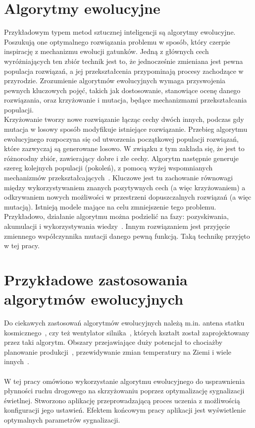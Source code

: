 \section*{Algorytmy ewolucyjne} Przykładowym typem metod sztucznej inteligencji są algorytmy ewolucyjne. Poszukują one optymalnego rozwiązania problemu w sposób, który czerpie inspirację z mechanizmu ewolucji gatunków. Jedną z głównych cech wyróżniających ten zbiór technik jest to, że jednocześnie zmieniana jest pewna populacja rozwiązań, a jej przekształcenia przypominają procesy zachodzące w przyrodzie. Zrozumienie algorytmów ewolucyjnych wymaga przyswojenia pewnych kluczowych pojęć, takich jak dostosowanie, stanowiące ocenę danego rozwiązania, oraz krzyżowanie i mutacja, będące mechanizmami przekształcania populacji. \\Krzyżowanie tworzy nowe rozwiązanie łącząc cechy dwóch innych, podczas gdy mutacja w losowy sposób modyfikuje istniejące rozwiązanie. 
Przebieg algorytmu ewolucyjnego rozpoczyna się od utworzenia początkowej populacji rozwiązań, które zazwyczaj są generowane losowo. W związku z tym zakłada się, że jest to różnorodny zbiór, zawierający dobre i złe cechy.
Algorytm następnie generuje szereg kolejnych populacji (pokoleń), z pomocą wyżej wspomnianych mechanizmów przekształcających~\cite{Cohoon:2003:EAP:903758.903786}. Kluczowe jest tu zachowanie równowagi między wykorzystywaniem znanych pozytywnych cech (a więc krzyżowaniem) a odkrywaniem nowych możliwości w przestrzeni dopuszczalnych rozwiązań (a więc mutacją). Istnieją modele mające na celu zmniejszenie tego problemu. Przykładowo, działanie algorytmu można podzielić na fazy: pozyskiwania, akumulacji i wykorzystywania wiedzy~\cite{10.1371/journal.pone.0095693}. Innym rozwiązaniem jest przyjęcie zmiennego współczynnika mutacji danego pewną funkcją. Taką technikę przyjęto w tej pracy. 
\section*{Przykładowe zastosowania algorytmów ewolucyjnych} Do ciekawych zastosowań algorytmów ewolucyjnych należą m.in. antena statku kosmicznego~\cite{Lohn2006AutomatedAD}, czy też wentylator silnika~\cite{article}, których kształt został zaprojektowany przez taki algorytm. Obszary przejawiające duży potencjał to chociażby planowanie produkcji~\cite{Wall:1996:GAR:925320}, przewidywanie zmian temperatury na Ziemi\cite{Stanislawska:2012:MGT:2400749.2401077} i wiele innych~\cite{Steinbuch2010}.
\paragraph{}W tej pracy omówiono wykorzystanie algorytmu ewolucyjnego do usprawnienia płynności ruchu drogowego na skrzyżowaniu poprzez optymalizację sygnalizacji świetlnej. Stworzono aplikację przeprowadzającą proces uczenia z możliwością konfiguracji jego ustawień. Efektem końcowym pracy aplikacji jest wyświetlenie optymalnych parametrów sygnalizacji.
